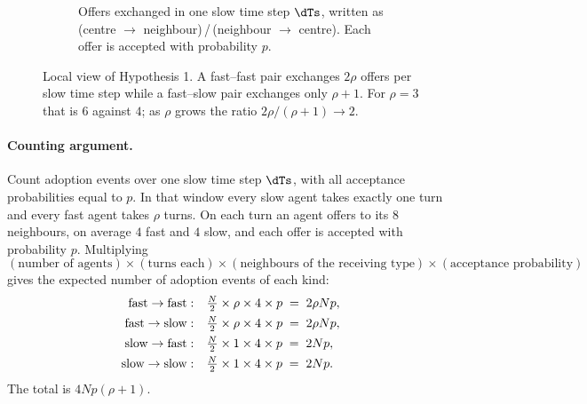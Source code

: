 \begin{figure}[ht]
\begin{subfigure}[b]{0.58\textwidth}
        \caption{Offers exchanged in one slow time step $\dTs$, written as (centre $\to$ neighbour)\,/\,(neighbour $\to$ centre). Each offer is accepted with probability $p$.}
        \label{fig:h1b}
    \end{subfigure}
    \caption{Local view of Hypothesis 1. A fast--fast pair exchanges $2\rho$ offers per slow time step while a fast--slow pair exchanges only $\rho+1$. For $\rho = 3$ that is $6$ against $4$; as $\rho$ grows the ratio $2\rho/(\rho+1) \to 2$.}
    \label{fig:h1}
\end{figure}

\paragraph{Counting argument.} Count adoption events over one slow time step $\dTs$, with all acceptance probabilities equal to $p$. In that window every slow agent takes exactly one turn and every fast agent takes $\rho$ turns. On each turn an agent offers to its $8$ neighbours, on average $4$ fast and $4$ slow, and each offer is accepted with probability $p$. Multiplying
\[
(\text{number of agents}) \times (\text{turns each}) \times (\text{neighbours of the receiving type}) \times (\text{acceptance probability})
\]
gives the expected number of adoption events of each kind:
\begin{align}
\text{fast} \to \text{fast}: &\quad \tfrac{N}{2} \times \rho \times 4 \times p \;=\; 2\rho N p, \notag\\
\text{fast} \to \text{slow}: &\quad \tfrac{N}{2} \times \rho \times 4 \times p \;=\; 2\rho N p, \notag\\
\text{slow} \to \text{fast}: &\quad \tfrac{N}{2} \times 1 \times 4 \times p \;=\; 2 N p, \notag\\
\text{slow} \to \text{slow}: &\quad \tfrac{N}{2} \times 1 \times 4 \times p \;=\; 2 N p.
\label{eq:counts}
\end{align}
The total is $4Np(\rho+1)$.

